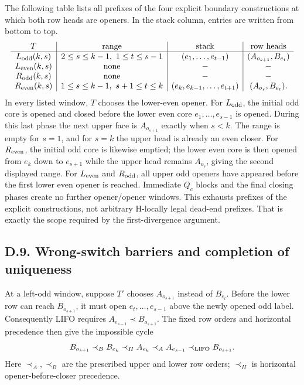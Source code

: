 \documentclass[11pt]{article}
\theoremstyle{definition}
\theoremstyle{remark}
\begin{document}
The following table lists all prefixes of the four explicit boundary
constructions at which both row heads are openers. In the stack column,
entries are written from bottom to top.
\[
\begin{array}{c|c|c|c}
T&\text{range}&\text{stack}&\text{row heads}\\\hline
L_{\rm odd}(k,s)&2\le s\le k-1,\ 1\le t\le s-1
 &(e_1,\ldots,e_{t-1})&(A_{o_{s+1}},B_{e_t})\\
L_{\rm even}(k,s)&\text{none}&-&-\\
R_{\rm odd}(k,s)&\text{none}&-&-\\
R_{\rm even}(k,s)&1\le s\le k-1,\ s+1\le t\le k
 &(e_k,e_{k-1},\ldots,e_{t+1})&(A_{o_s},B_{e_t}).
\end{array}
\]
In every listed window, $T$ chooses the lower-even opener.
For $L_{\rm odd}$, the initial odd core is opened and closed before the
lower even core $e_1,\ldots,e_{s-1}$ is opened. During this last phase
the next upper face is $A_{o_{s+1}}$ exactly when $s<k$. The range is
empty for $s=1$, and for $s=k$ the upper head is already an even closer.
For $R_{\rm even}$, the initial odd core is likewise emptied; the lower
even core is then opened from $e_k$ down to $e_{s+1}$ while the upper
head remains $A_{o_s}$, giving the second displayed range.
For $L_{\rm even}$ and $R_{\rm odd}$, all upper odd openers have appeared
before the first lower even opener is reached. Immediate $Q_c$ blocks
and the final closing phases create no further opener/opener windows.
This exhausts prefixes of the explicit constructions, not arbitrary
H-locally legal dead-end prefixes. That is exactly the scope required
by the first-divergence argument.

\subsection{D.9. Wrong-switch barriers and completion of
uniqueness}\label{d.9.-wrong-switch-barriers}

At a left-odd window, suppose $T'$ chooses $A_{o_{s+1}}$ instead of
$B_{e_t}$. Before the lower row can reach $B_{o_{s+1}}$, it must open
$e_t,\ldots,e_{s-1}$ above the newly opened odd label. Consequently
LIFO requires $A_{e_{s-1}}\prec B_{o_{s+1}}$. The fixed row orders and
horizontal precedence then give the impossible cycle
\[
 B_{o_{s+1}}
 \mathrel{\prec_B} B_{e_k}
 \mathrel{\prec_H} A_{e_k}
 \mathrel{\prec_A} A_{e_{s-1}}
 \mathrel{\prec_{\rm LIFO}} B_{o_{s+1}}.
\]
Here $\prec_A,\prec_B$ are the prescribed upper and lower row orders;
$\prec_H$ is horizontal opener-before-closer precedence.
\end{document}
